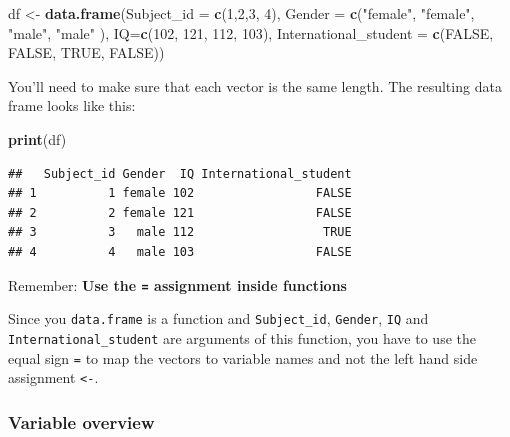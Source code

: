 \documentclass[
]{scrartcl}
\makeatletter
\newenvironment{Shaded}{\begin{snugshade}}{\end{snugshade}}
\newcommand{\DataTypeTok}[1]{\textcolor[rgb]{0.13,0.29,0.53}{#1}}
\newcommand{\DecValTok}[1]{\textcolor[rgb]{0.00,0.00,0.81}{#1}}
\newcommand{\KeywordTok}[1]{\textcolor[rgb]{0.13,0.29,0.53}{\textbf{#1}}}
\newcommand{\NormalTok}[1]{#1}
\newcommand{\OtherTok}[1]{\textcolor[rgb]{0.56,0.35,0.01}{#1}}
\newcommand{\StringTok}[1]{\textcolor[rgb]{0.31,0.60,0.02}{#1}}
\newenvironment{kframe}{%
\medskip{}
\setlength{\fboxsep}{.8em}
 \def\at@end@of@kframe{}%
 \ifinner\ifhmode%
  \def\at@end@of@kframe{\end{minipage}}%
  \begin{minipage}{\columnwidth}%
 \fi\fi%
 \def\FrameCommand##1{\hskip\@totalleftmargin \hskip-\fboxsep
 \colorbox{shadecolor}{##1}\hskip-\fboxsep
     \hskip-\linewidth \hskip-\@totalleftmargin \hskip\columnwidth}%
 \MakeFramed {\advance\hsize-\width
   \@totalleftmargin\z@ \linewidth\hsize
   \@setminipage}}%
 {\par\unskip\endMakeFramed%
 \at@end@of@kframe}
\newenvironment{rmdblock}[1]
  {
  \begin{itemize}
  \renewcommand{\labelitemi}{
    \raisebox{-.7\height}[0pt][0pt]{
      {\setkeys{Gin}{width=3em,keepaspectratio}\texttt{[image: images/\#1]}}
    }
  }
  \setlength{\fboxsep}{1em}
  \begin{kframe}
  \item
  }
  {
  \end{kframe}
  \end{itemize}
  }
\newenvironment{important}
    {\begin{rmdblock}{hint}}
    {\end{rmdblock}}
\makeatother
\begin{document}
\begin{Shaded}
\begin{Highlighting}[]
\NormalTok{df \textless{}{-}}\StringTok{ }\KeywordTok{data.frame}\NormalTok{(}\DataTypeTok{Subject\_id =} \KeywordTok{c}\NormalTok{(}\DecValTok{1}\NormalTok{,}\DecValTok{2}\NormalTok{,}\DecValTok{3}\NormalTok{, }\DecValTok{4}\NormalTok{),}
                 \DataTypeTok{Gender =} \KeywordTok{c}\NormalTok{(}\StringTok{"female"}\NormalTok{, }\StringTok{"female"}\NormalTok{, }\StringTok{"male"}\NormalTok{, }\StringTok{"male"}\NormalTok{ ),}
                 \DataTypeTok{IQ=}\KeywordTok{c}\NormalTok{(}\DecValTok{102}\NormalTok{, }\DecValTok{121}\NormalTok{, }\DecValTok{112}\NormalTok{, }\DecValTok{103}\NormalTok{),}
                 \DataTypeTok{International\_student =} \KeywordTok{c}\NormalTok{(}\OtherTok{FALSE}\NormalTok{, }\OtherTok{FALSE}\NormalTok{, }\OtherTok{TRUE}\NormalTok{, }\OtherTok{FALSE}\NormalTok{))}
\end{Highlighting}
\end{Shaded}

You'll need to make sure that each vector is the same length. The resulting data frame looks like this:

\begin{Shaded}
\begin{Highlighting}[]
\KeywordTok{print}\NormalTok{(df)}
\end{Highlighting}
\end{Shaded}

\begin{verbatim}
##   Subject_id Gender  IQ International_student
## 1          1 female 102                 FALSE
## 2          2 female 121                 FALSE
## 3          3   male 112                  TRUE
## 4          4   male 103                 FALSE
\end{verbatim}

\begin{important}
Remember: \textbf{Use the \texttt{=} assignment inside functions}

Since you \texttt{data.frame} is a function and \texttt{Subject\_id},
\texttt{Gender}, \texttt{IQ} and \texttt{International\_student} are
arguments of this function, you have to use the equal sign \texttt{=} to
map the vectors to variable names and not the left hand side assignment
\texttt{\textless{}-}.
\end{important}

\hypertarget{variable-overview}{%
\subsubsection*{Variable overview}\label{variable-overview}}
\end{document}
